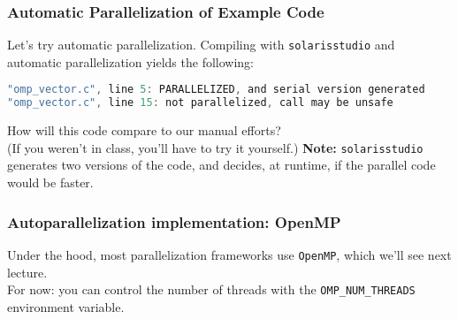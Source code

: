 \begin{frame}[fragile]
  \frametitle{Automatic Parallelization of Example Code}


  Let's try automatic parallelization.
  \vfill
  Compiling with {\tt solarisstudio} and automatic parallelization yields
  the following:


{\scriptsize
  \begin{lstlisting}[language=C]
% solarisstudio-cc -O3 -xautopar -xloopinfo omp_vector.c 
"omp_vector.c", line 5: PARALLELIZED, and serial version generated                 
"omp_vector.c", line 15: not parallelized, call may be unsafe
  \end{lstlisting}
}

  How will this code compare to our manual efforts? \\
  (If you weren't in class, you'll have to try it yourself.)
  \vfill
  {\bf Note:} {\tt solarisstudio} generates two versions of the code, 
  and decides, at runtime, if the parallel code would be faster.


\end{frame}


\begin{frame}
  \frametitle{Autoparallelization implementation: OpenMP}


  Under the hood, most parallelization frameworks use {\tt OpenMP},
      which we'll see next lecture.\\[1em]
  For now: you can control the number of threads with the
      {\tt OMP\_NUM\_THREADS} environment variable.\\[1em]

\end{frame}

